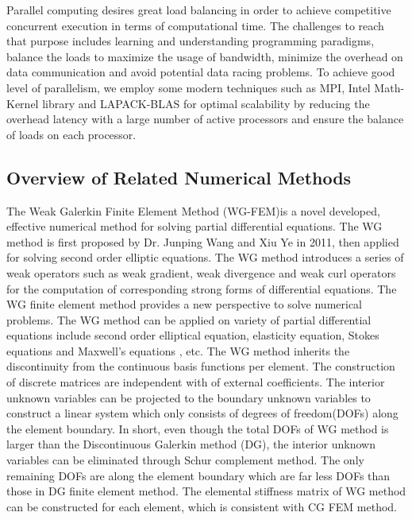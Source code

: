 Parallel computing desires great load balancing in order to achieve competitive concurrent execution in terms of computational time. The challenges to reach that purpose includes learning and understanding programming paradigms,  balance the loads to maximize the usage of bandwidth, minimize the overhead on data communication and avoid potential data racing problems. To achieve good level of parallelism, we employ some modern techniques such as MPI, Intel Math-Kernel library and LAPACK-BLAS for optimal scalability by reducing the overhead latency with a large number of active processors and ensure the balance of loads on each processor.

\subsection{Overview of Related Numerical Methods}

The Weak Galerkin Finite Element Method (WG-FEM)is a novel developed, effective numerical method for solving partial differential equations. The WG method is first proposed by Dr. Junping Wang and Xiu Ye in 2011, then applied for solving second order elliptic equations\cite{wang2014weak}. The WG method introduces a series of weak operators such as weak gradient, weak divergence and weak curl operators for the computation of corresponding strong forms of differential equations. The WG finite element method provides a  new perspective to solve numerical problems. The WG method can be applied on variety of partial differential equations include second order elliptical equation, elasticity equation\cite{wang2016locking}, Stokes equations \cite{wang2016weak} and Maxwell's equations \cite{mu2013weak}, etc. The WG method inherits the discontinuity from the continuous basis functions per element. The construction of discrete matrices are independent with of external coefficients. The interior unknown variables can be projected to the boundary unknown variables to construct a linear system which only consists of degrees of freedom(DOFs) along the element boundary. In short, even though the total DOFs of WG method is larger than the Discontinuous Galerkin method (DG), the interior unknown variables can be eliminated through Schur complement method. The only remaining DOFs are along the element boundary which are far less DOFs than those in DG finite element method. The elemental stiffness matrix of WG method can be constructed for each element, which is consistent with CG FEM method. 

